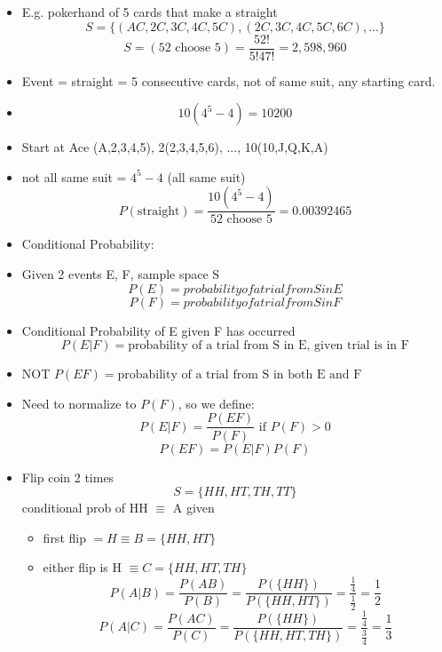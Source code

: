 \begin{itemize}
    \item E.g. pokerhand of 5 cards that make a straight
    \[ S = \{ (AC, 2C, 3C, 4C, 5C), (2C, 3C, 4C, 5C, 6C), ...\}\]
    \[ S = (52 \text{ choose } 5) = \frac{52!}{5! 47!} = 2,598,960\]
    \item Event = straight = 5 consecutive cards, not of same suit, any starting card.
    \item \[ 10 ( 4^5 - 4) = 10200\]
    \item Start at Ace (A,2,3,4,5), 2(2,3,4,5,6), ..., 10(10,J,Q,K,A)
    \item not all same suit = $4^5 - 4$ (all same suit)
    \[ P (\text{straight}) = \frac{10(4^5 - 4)}{52 \text{ choose } 5} = 0.00392465\]
    \item Conditional Probability:
    \item Given 2 events E, F, sample space S
    \[ P(E) = probability of  a trial from S in E \]
    \[ P(F) = probability of a trial from S in F \]
    \item Conditional Probability of E given F has occurred
    \[ P(E|F) = \text{probability of a trial from S in E, given trial is in F} \]
    \item NOT $P(EF) = \text{probability of a trial from S in both E and F} $
    \item Need to normalize to $P(F)$, so we define:
    \[ P(E|F) = \frac{P(EF)}{P(F)} \text{ if } P(F) > 0\]
    \[ P(EF) = P(E|F) P(F)\]
    \item Flip coin 2 times
    \[ S = \{HH, HT, TH, TT\}\]
    conditional prob of HH $\equiv$ A    
    given 
    \begin{itemize}
        \item first flip $= H \equiv B = \{HH, HT\}$
        \item either flip is H $\equiv C = \{HH, HT, TH\}$
        \[ P(A|B) = \frac{P(A B)}{P(B)} = \frac{P(\{HH\})}{P(\{HH, HT\})} = \frac{\frac{1}{4}}{\frac{1}{2}} = \frac{1}{2}\]
        \[ P(A|C) = \frac{P(A C)}{P(C)} = \frac{P(\{HH\})}{P(\{HH, HT, TH\})} = \frac{\frac{1}{4}}{\frac{3}{4}} = \frac{1}{3}\]
    \end{itemize}
\end{itemize}
